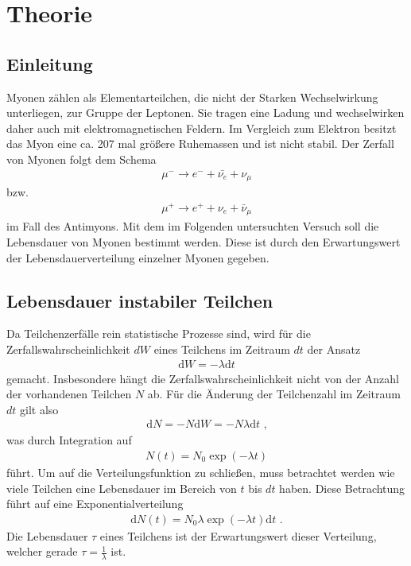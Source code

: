 \section{Theorie}
\label{sec:Theorie}

\subsection{Einleitung}
\label{subsec:Einleitung}
Myonen zählen als Elementarteilchen, die nicht der Starken Wechselwirkung unterliegen, zur Gruppe der Leptonen.
Sie tragen eine Ladung und wechselwirken daher auch mit elektromagnetischen Feldern.
Im Vergleich zum Elektron besitzt das Myon eine ca. 207 mal größere Ruhemassen und ist nicht stabil.
Der Zerfall von Myonen folgt dem Schema
\begin{align}
\mu^- \longrightarrow e^- + \bar{\nu_e} + \nu_\mu
\end{align}
bzw.
\begin{align}
\mu^+ \longrightarrow e^+ + \nu_e + \bar{\nu}_\mu
\end{align}
im Fall des Antimyons.
Mit dem im Folgenden untersuchten Versuch soll die Lebensdauer von Myonen bestimmt werden.
Diese ist durch den Erwartungswert der Lebensdauerverteilung einzelner Myonen gegeben.
\subsection{Lebensdauer instabiler Teilchen}
\label{subsec:Lebensdauer instabiler Teilchen}
Da Teilchenzerfälle rein statistische Prozesse sind, wird für die Zerfallswahrscheinlichkeit $dW$ eines Teilchens im Zeitraum $dt$ der Ansatz
\begin{align}
\text{d} W = -  \lambda \text{d} t
\end{align}
gemacht.
Insbesondere hängt die Zerfallswahrscheinlichkeit nicht von der Anzahl der vorhandenen Teilchen $N$ ab.
Für die Änderung der Teilchenzahl im Zeitraum $dt$ gilt also
\begin{align}
\text{d} N = - N \text{d} W = - N \lambda \text{d} t\text{ ,}
\end{align}
was durch Integration auf
\begin{align}
N(t)=N_0\exp(-\lambda t)
\end{align}
führt.
Um auf die Verteilungsfunktion zu schließen, muss betrachtet werden wie viele Teilchen eine Lebensdauer im Bereich von $t$ bis $dt$ haben.
Diese Betrachtung führt auf eine Exponentialverteilung
\begin{align}
  \label{eqn:exp}
  \text{d} N(t)=N_0 \lambda \exp(-\lambda t) \text{d} t \text{ .}
\end{align}
Die Lebensdauer $\tau$ eines Teilchens ist der Erwartungswert dieser Verteilung, welcher gerade $\tau = \frac{1}{\lambda}$ ist.
\cite{sample}

